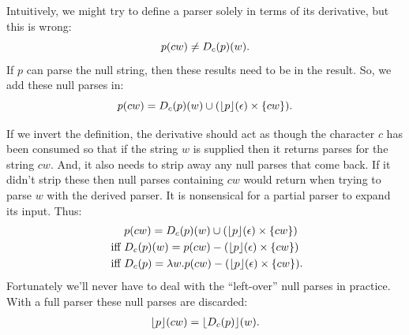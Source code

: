 Intuitively, we might try to define a parser solely 
in terms of its derivative, but this is wrong:
\begin{equation*}
 p(cw) \neq D_c(p)(w)\text.
\end{equation*}
%
If $p$ can parse the null string, then these results need to 
be in the result.
%
So, we add these null parses in:
\begin{equation*}
p(cw) = D_c(p)(w) \cup  ( \lfloor p \rfloor(\epsilon)  \times \left\{ cw \right\} ) 
 \text.
\end{equation*}


If we invert the definition, the derivative
should act as though the character $c$ has been consumed so that if the
string $w$ is supplied then it returns parses for the string $cw$.
%
And, it also needs to strip away any null parses that come back.
%
If it didn't strip these then null parses containing $cw$ would return when
trying to parse $w$ with the derived parser.
%
It is nonsensical for a partial parser to expand its input.
%
Thus:
\begin{align*}
  &p(cw) = D_c(p)(w) \cup (\lfloor p \rfloor(\epsilon) \times \left\{cw\right\})
  \\
\text{ iff } 
&D_c(p)(w) = p(cw) - (\lfloor p \rfloor(\epsilon) \times \left\{cw\right\})
              \\
\text{ iff }  
&D_c(p) = \lambda w . p(cw) - (\lfloor p \rfloor(\epsilon) \times \left\{cw\right\})
\text.
\end{align*}
%
Fortunately we'll never have to deal with the ``left-over'' null parses in practice.
%
With a full parser these null parses are discarded:
\begin{align*}
  \lfloor p \rfloor(cw) = \lfloor D_c(p) \rfloor(w)
  \text.
\end{align*}



